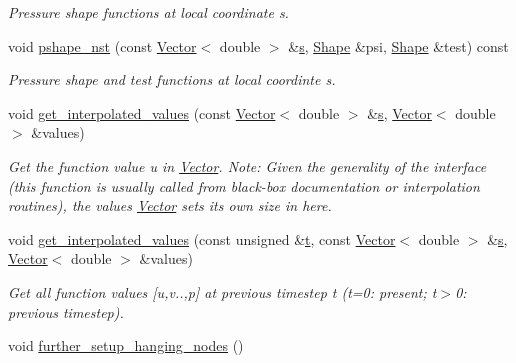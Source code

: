 \begin{DoxyCompactItemize}
\begin{DoxyCompactList}\small\item\em Pressure shape functions at local coordinate s. \end{DoxyCompactList}\item 
void \hyperlink{classoomph_1_1PRefineableQCrouzeixRaviartElement_a5891e3675a411f77fca204fa567c71da}{pshape\+\_\+nst} (const \hyperlink{classoomph_1_1Vector}{Vector}$<$ double $>$ \&\hyperlink{cfortran_8h_ab7123126e4885ef647dd9c6e3807a21c}{s}, \hyperlink{classoomph_1_1Shape}{Shape} \&psi, \hyperlink{classoomph_1_1Shape}{Shape} \&test) const
\begin{DoxyCompactList}\small\item\em Pressure shape and test functions at local coordinte s. \end{DoxyCompactList}\item 
void \hyperlink{classoomph_1_1PRefineableQCrouzeixRaviartElement_ac9cfbe5c8df894511fd03d49b4015d19}{get\+\_\+interpolated\+\_\+values} (const \hyperlink{classoomph_1_1Vector}{Vector}$<$ double $>$ \&\hyperlink{cfortran_8h_ab7123126e4885ef647dd9c6e3807a21c}{s}, \hyperlink{classoomph_1_1Vector}{Vector}$<$ double $>$ \&values)
\begin{DoxyCompactList}\small\item\em Get the function value u in \hyperlink{classoomph_1_1Vector}{Vector}. Note\+: Given the generality of the interface (this function is usually called from black-\/box documentation or interpolation routines), the values \hyperlink{classoomph_1_1Vector}{Vector} sets its own size in here. \end{DoxyCompactList}\item 
void \hyperlink{classoomph_1_1PRefineableQCrouzeixRaviartElement_af7337a2ad744a06a2e5c3590dcd07dfb}{get\+\_\+interpolated\+\_\+values} (const unsigned \&\hyperlink{cfortran_8h_af6f0bd3dc13317f895c91323c25c2b8f}{t}, const \hyperlink{classoomph_1_1Vector}{Vector}$<$ double $>$ \&\hyperlink{cfortran_8h_ab7123126e4885ef647dd9c6e3807a21c}{s}, \hyperlink{classoomph_1_1Vector}{Vector}$<$ double $>$ \&values)
\begin{DoxyCompactList}\small\item\em Get all function values \mbox{[}u,v..,p\mbox{]} at previous timestep t (t=0\+: present; t$>$0\+: previous timestep). \end{DoxyCompactList}\item 
void \hyperlink{classoomph_1_1PRefineableQCrouzeixRaviartElement_a782e45a47d5e1df77bcbc6480f90c24d}{further\+\_\+setup\+\_\+hanging\+\_\+nodes} ()

\end{DoxyCompactItemize}
